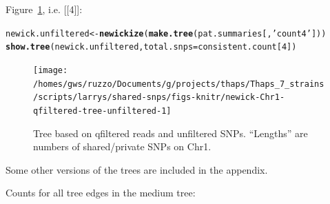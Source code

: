 \documentclass{article}\usepackage[]{graphicx}\usepackage[]{color}
\makeatletter
\newcommand{\hlnum}[1]{\textcolor[rgb]{0.686,0.059,0.569}{#1}}%
\newcommand{\hlstr}[1]{\textcolor[rgb]{0.192,0.494,0.8}{#1}}%
\newcommand{\hlstd}[1]{\textcolor[rgb]{0.345,0.345,0.345}{#1}}%
\newcommand{\hlkwb}[1]{\textcolor[rgb]{0.69,0.353,0.396}{#1}}%
\newcommand{\hlkwc}[1]{\textcolor[rgb]{0.333,0.667,0.333}{#1}}%
\newcommand{\hlkwd}[1]{\textcolor[rgb]{0.737,0.353,0.396}{\textbf{#1}}}%
\newenvironment{kframe}{%
 \def\at@end@of@kframe{}%
 \ifinner\ifhmode%
  \def\at@end@of@kframe{\end{minipage}}%
  \begin{minipage}{\columnwidth}%
 \fi\fi%
 \def\FrameCommand##1{\hskip\@totalleftmargin \hskip-\fboxsep
 \colorbox{shadecolor}{##1}\hskip-\fboxsep
     \hskip-\linewidth \hskip-\@totalleftmargin \hskip\columnwidth}%
 \MakeFramed {\advance\hsize-\width
   \@totalleftmargin\z@ \linewidth\hsize
   \@setminipage}}%
 {\par\unskip\endMakeFramed%
 \at@end@of@kframe}
\newenvironment{knitrout}{}{} %
\makeatother
\begin{document}
Figure~\ref{fig:tree-unfiltered}, i.e. [[4]]:

\begin{knitrout}\scriptsize
{}\color{fgcolor}\begin{kframe}
\begin{alltt}
\hlstd{newick.unfiltered} \hlkwb{<-} \hlkwd{newickize}\hlstd{(}\hlkwd{make.tree}\hlstd{(pat.summaries[,}\hlstr{'count4'}\hlstd{]))}
\hlkwd{show.tree}\hlstd{(newick.unfiltered,} \hlkwc{total.snps}\hlstd{=consistent.count[}\hlnum{4}\hlstd{])}
\end{alltt}
\end{kframe}\begin{figure}

{\centering \texttt{[image: /homes/gws/ruzzo/Documents/g/projects/thaps/Thaps\_7\_strains/scripts/larrys/shared-snps/figs-knitr/newick-Chr1-qfiltered-tree-unfiltered-1]} 

}

\caption[Tree based on qfiltered reads and unfiltered SNPs]{Tree based on qfiltered reads and unfiltered SNPs.  ``Lengths'' are numbers of shared/private SNPs on Chr1.}\label{fig:tree-unfiltered}
\end{figure}


\end{knitrout}

Some other versions of the trees are included in the appendix.

Counts for all tree edges in the medium tree: 
\end{document}

